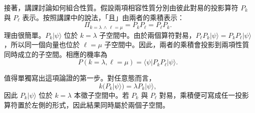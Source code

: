 \begin{classroomqa}
\end{classroomqa}

\begin{classroomqa}
\end{classroomqa}

\begin{classroomqa}
\end{classroomqa}

\begin{classroomqa}
\end{classroomqa}

接著，講課討論如何組合性質。假設兩項相容性質分別由彼此對易的投影算符 \(P_k\) 與 \(P_\ell\) 表示。按照講課中的說法，「且」由兩者的乘積表示：
\begin{equation}
\Pi_{k=\lambda\,\wedge\,\ell=\mu}=P_kP_\ell=P_\ell P_k.
\end{equation}
理由很簡單。\(P_k|\psi\rangle\) 位於 \(k=\lambda\) 子空間中。由於兩個算符對易，\(P_\ell P_k|\psi\rangle=P_kP_\ell|\psi\rangle\)，所以同一個向量也位於 \(\ell=\mu\) 子空間中。因此，兩者的乘積會投影到兩項性質同時成立的子空間。相應的機率為
\begin{equation}
P(k=\lambda,\ell=\mu)=\langle\psi|P_kP_\ell|\psi\rangle.
\end{equation}

值得單獨寫出這項論證的第一步。對任意態而言，
\begin{equation}
k\bigl(P_k|\psi\rangle\bigr)=\lambda P_k|\psi\rangle,
\end{equation}
因此 \(P_k|\psi\rangle\) 位於 \(k=\lambda\) 本徵子空間中。若 \(P_k\) 與 \(P_\ell\) 對易，乘積便可寫成任一投影算符置於左側的形式，因此結果同時屬於兩個子空間。

